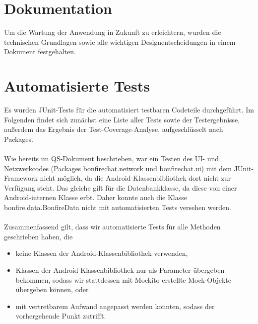 


\clearpage
\section{Dokumentation}

Um die Wartung der Anwendung in Zukunft zu erleichtern, wurden die technischen Grundlagen
sowie alle wichtigen Designentscheidungen in einem Dokument festgehalten.






\clearpage
\section{Automatisierte Tests}

Es wurden JUnit-Tests für die automatisiert testbaren Codeteile durchgeführt.
Im Folgenden findet sich zunächst eine Liste aller Tests sowie der Testergebnisse,
außerdem das Ergebnis der Test-Coverage-Analyse, aufgeschlüsselt nach Packages.
\\\\
Wie bereits im QS-Dokument beschrieben, war ein Testen des UI- und Netzwerkcodes
(Packages bonfirechat.network und bonfirechat.ui)
mit dem JUnit-Framework nicht möglich, da die Android-Klassenbibliothek dort nicht
zur Verfügung steht. Das gleiche gilt für die Datenbankklasse, da diese von einer
Android-internen Klasse erbt. Daher konnte auch die Klasse bonfire.data.BonfireData
nicht mit automatisierten Tests versehen werden.
\\\\
Zusammenfassend gilt, dass wir automatisierte Tests für alle Methoden geschrieben haben,
die
\begin{itemize}
\item keine Klassen der Android-Klassenbibliothek verwenden,
\item Klassen der Android-Klassenbibliothek nur als Parameter übergeben bekommen,
sodass wir stattdessen mit Mockito erstellte Mock-Objekte übergeben können, oder
\item mit vertretbarem Aufwand angepasst werden konnten, sodass der vorhergehende Punkt zutrifft.
\end{itemize}

